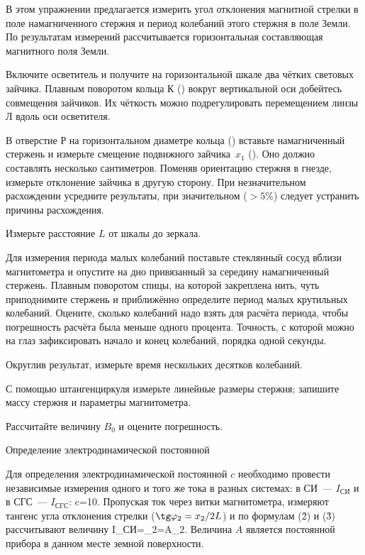 \zad

В этом упражнении предлагается измерить угол отклонения магнитной стрелки в поле намагниченного стержня и период
колебаний этого стержня в поле Земли. По результатам измерений рассчитывается горизонтальная составляющая магнитного
поля Земли.

\n Включите осветитель и получите на горизонтальной шкале два чётких световых зайчика. Плавным поворотом кольца К ()
вокруг вертикальной оси добейтесь совмещения зайчиков. Их чёткость можно подрегулировать перемещением линзы Л вдоль оси
осветителя.

\n В отверстие Р на горизонтальном диаметре кольца () вставьте намагниченный стержень и измерьте смещение подвижного
зайчика~$x_1$ (). Оно должно составлять несколько сантиметров. Поменяв ориентацию стержня в гнезде, измерьте
отклонение зайчика в другую сторону. При незначительном расхождении усредните результаты, при значительном ($>5$\%)
следует устранить причины расхождения.

\n Измерьте расстояние $L$ от шкалы до зеркала.

\n Для измерения периода малых колебаний поставьте стеклянный сосуд вблизи магнитометра и опустите на дно привязанный за
середину намагниченный стержень. Плавным поворотом спицы, на которой закреплена нить, чуть приподнимите стержень и
приближённо определите период малых крутильных колебаний. Оцените, сколько колебаний надо взять для расчёта периода,
чтобы погрешность расчёта была меньше одного процента. Точность, с которой можно на глаз зафиксировать начало и конец
колебаний, порядка одной секунды.

Округлив результат, измерьте время нескольких десятков колебаний.

\n С помощью штангенциркуля измерьте линейные размеры стержня; запишите массу стержня и параметры магнитометра.

\n Рассчитайте величину $B_0$ и оцените погрешность.%

\zn Определение электродинамической постоянной

Для определения электродинамической постоянной $c$ необходимо провести независимые измерения одного и того же тока в
разных системах: в СИ~--- $I_{СИ}$ и в СГС~--- $I_{СГС}$:
c=10.
\ee
Пропуская ток через витки магнитометра, измеряют тангенс угла отклонения стрелки ($\tg\varphi_2=x_2/2L$) и по формулам
(\r2) и (\r3) рассчитывают величину
I_{СИ}=\tg\varphi_2=A\tg\varphi_2.
\ee
Величина $A$ является постоянной прибора в данном месте земной поверхности.

